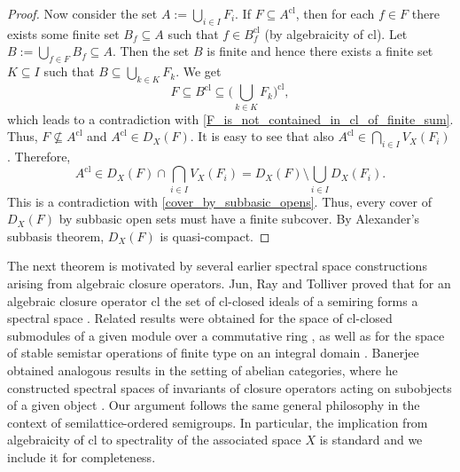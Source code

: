\documentclass[10pt, reqno]{amsart}
\theoremstyle{plain}
\theoremstyle{definition}
\begin{document}
\begin{proof}
    Now consider the set $A := \bigcup_{i \in I} F_i$. If $F \subseteq A^\mathrm{cl}$, then for each $f \in F$ there exists some finite set $B_f \subseteq A$ such that $f \in B_f^\mathrm{cl}$ (by algebraicity of $\mathrm{cl}$). Let $B := \bigcup_{f\in F}B_f \subseteq A$. Then the set $B$ is finite and hence there exists a finite set $K \subseteq I$ such that $B \subseteq \bigcup_{k \in K} F_k$. We get $$F \subseteq B^\mathrm{cl} \subseteq \Big(\bigcup_{k \in K} F_k\Big)^\mathrm{cl},$$ 
    which leads to a contradiction with \eqref{F_is_not_contained_in_cl_of_finite_sum}. Thus, $F \nsubseteq A^\mathrm{cl}$ and $A^\mathrm{cl} \in D_X(F)$. It is easy to see that also $A^\mathrm{cl} \in \bigcap_{i \in I} V_X(F_i)$. Therefore, 
    \begin{equation*}
        A^\mathrm{cl} \in D_X(F) \cap \bigcap_{i \in I} V_X(F_i) = D_X(F) \setminus \bigcup_{i \in I} D_X(F_i). 
    \end{equation*}
    This is a contradiction with \eqref{cover_by_subbasic_opens}. Thus, every cover of $D_X(F)$ by subbasic open sets must have a finite subcover. By Alexander's subbasis theorem, $D_X(F)$ is quasi-compact. 
\end{proof}
The next theorem is motivated by several earlier spectral space constructions arising from algebraic closure operators. Jun, Ray and Tolliver proved that for an algebraic closure operator $\mathrm{cl}$ the set of $\mathrm{cl}$-closed ideals of a semiring forms a spectral space \cite[Proposition~3.9]{JunRayTolliver}. Related results were obtained for the space of $\mathrm{cl}$-closed submodules of a given module over a commutative ring \cite[Proposition 3.4]{FinocchiaroFontanaSpiritoNullstellensatz}, as well as for the space of stable semistar operations of finite type on an integral domain \cite[Theorem 4.6]{FinocchiaroFontanaSpirito}. Banerjee obtained analogous results in the setting of abelian categories, where he constructed spectral spaces of invariants of closure operators acting on subobjects of a given object \cite[Proposition 3.3]{Banerjee}. Our argument follows the same general philosophy in the context of semilattice-ordered semigroups. In particular, the implication from algebraicity of $\mathrm{cl}$ to spectrality of the associated space $X$ is standard and we include it for completeness. 
\end{document}
